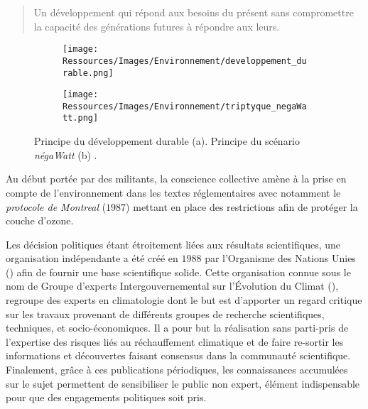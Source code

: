 \blockquote{
    Un développement qui répond aux besoins du présent sans
    compromettre la capacité des générations futures à répondre aux leurs.
}

\begin{figure}
    \centering
    \begin{subfigure}[b]{0.55\textwidth}
        \centering
        \texttt{[image: Ressources/Images/Environnement/developpement\_durable.png]}
        \caption{}
        \label{fig:developpement_durable}
    \end{subfigure}
    \quad
    \begin{subfigure}[b]{0.4\textwidth}
        \centering
        \texttt{[image: Ressources/Images/Environnement/triptyque\_negaWatt.png]}
        \caption{}
        \label{fig:negawatt_axes}
    \end{subfigure}
    \caption[Principe du développement durable et du scénario négaWatt]
             {Principe du développement durable \protect\footnotemark (a). Principe du
              scénario \textit{négaWatt} (b) \parencite{Salomon2012}.}
    \label{fig:developpement_durable_negawatt}
\end{figure}


Au début portée par des militants, la conscience collective amène à la prise en compte de
l’environnement dans les textes réglementaires avec notamment le \textit{protocole de
Montreal} ($1987$) mettant en place des restrictions afin de protéger la couche d’ozone.

Les décision politiques étant étroitement liées aux résultats scientifiques,
une organisation indépendante a été créé en $1988$ par l’Organisme des Nations
Unies () afin de fournir une base scientifique solide. Cette organisation connue sous le nom de
Groupe d'experts Intergouvernemental sur l'Évolution du Climat (), regroupe
des experts en climatologie dont le but est d’apporter un regard critique sur
les travaux provenant de différents groupes de recherche scientifiques, techniques,
et socio-économiques. Il a pour but la réalisation sans parti-pris de l’expertise
des risques liés au réchauffement climatique et de faire re-sortir les informations
et découvertes faisant consensus dans la communauté scientifique. Finalement, grâce à ces
publications périodiques, les connaissances accumulées sur le sujet permettent de
sensibiliser le public non expert, élément indispensable pour que des engagements
politiques soit pris.

